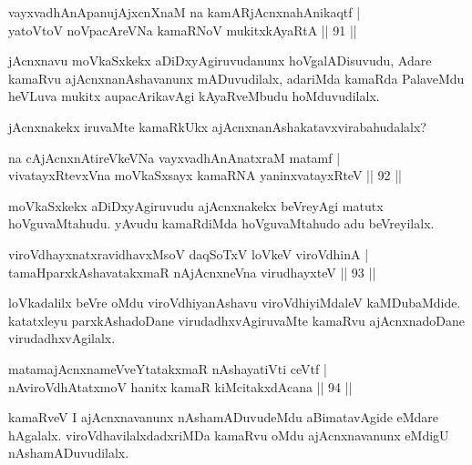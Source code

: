 \begin{shl}
vayxvadhAnApanujAjxcnXnaM na kamARjAcnxnahAnikaqtf |\\
yatoV\s toV noVpacAreVNa kamaRNoV mukitxkAyaRtA \hfill || 91 ||
\end{shl}

\begin{artha}
jAcnxnavu moVkaSxkekx aDiDxyAgiruvudanunx hoVgalADisuvudu, Adare kamaRvu ajAcnxnanAshavanunx mADuvudilalx, adariMda kamaRda PalaveMdu heVLuva mukitx aupacArikavAgi kAyaRveMbudu hoMduvudilalx.
\end{artha}

\begin{artha}
jAcnxnakekx iruvaMte kamaRkUkx ajAcnxnanAshakatavxvirabahudalalx?
\end{artha}


\begin{shl}
na cAjAcnxnAtireVkeVNa vayxvadhAnAnatxraM matamf |\\
vivatayxRtevxVna moVkaSxsayx kamaRNA yaninxvatayxRteV \hfill || 92 ||
\end{shl}

\begin{artha}
moVkaSxkekx aDiDxyAgiruvudu ajAcnxnakekx beVreyAgi matutx hoVguvaMtahudu. yAvudu kamaRdiMda hoVguvaMtahudo adu beVreyilalx.
\end{artha}

\begin{shl}
viroVdhayxnatxravidhavxMsoV daqSoTxV loVkeV viroVdhinA |\\
tamaHparxkAshavatakxmaR nAjAcnxneVna virudhayxteV \hfill || 93 ||
\end{shl}

\begin{artha}
loVkadalilx beVre oMdu viroVdhiyanAshavu viroVdhiyiMdaleV kaMDubaMdide. katatxleyu parxkAshadoDane virudadhxvAgiruvaMte kamaRvu ajAcnxnadoDane virudadhxvAgilalx.
\end{artha}

\begin{shl}
matamajAcnxnameVveYtatakxmaR nAshayatiVti ceVtf |\\
nAviroVdhAtatxmoV hanitx kamaR kiMcitakxdAcana \hfill || 94 ||
\end{shl}

\begin{artha}
kamaRveV I ajAcnxnavanunx nAshamADuvudeMdu aBimatavAgide eMdare hAgalalx. viroVdhavilalxdadxriMDa kamaRvu oMdu ajAcnxnavanunx eMdigU nAshamADuvudilalx.
\end{artha}

